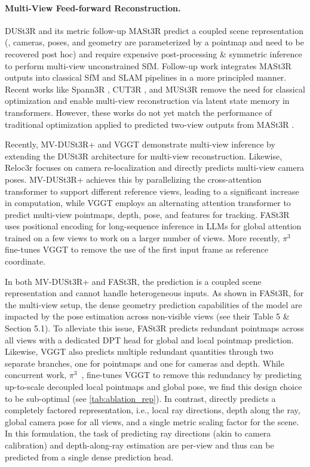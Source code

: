 \paragraph{Multi-View Feed-forward Reconstruction.}

DUSt3R and its metric follow-up MASt3R \cite{LeroyCR2024} predict a coupled scene representation (\ie, cameras, poses, and geometry are parameterized by a pointmap and need to be recovered post hoc) and require expensive post-processing \& symmetric inference to perform multi-view unconstrained SfM.
Follow-up work \cite{DuistZWLCR2025, MuraiDD2025, ElfleZAL2025, PatakSSP2025} integrates MASt3R outputs into classical SfM and SLAM pipelines in a more principled manner.
Recent works like Spann3R \cite{WangA2025}, CUT3R \cite{WangZHEK2025}, and MUSt3R \cite{CabonSACCRL2025} remove the need for classical optimization and enable multi-view reconstruction via latent state memory in transformers.
However, these works do not yet match the performance of traditional optimization applied to predicted two-view outputs from MASt3R \cite{DuistZWLCR2025,MuraiDD2025}.

Recently, MV-DUSt3R+ \cite{TangFWXRSY2025} and VGGT \cite{WangCKVRN2025} demonstrate multi-view inference by extending the DUSt3R architecture for multi-view reconstruction.
Likewise, Reloc3r \cite{DongWLCFKY2025} focuses on camera re-localization and directly predicts multi-view camera poses.
MV-DUSt3R+ achieves this by parallelizing the cross-attention transformer to support different reference views, leading to a significant increase in computation, while VGGT employs an alternating attention transformer to predict multi-view pointmaps, depth, pose, and features for tracking.
FASt3R \cite{YangSLHTCCMF2025} uses positional encoding for long-sequence inference in LLMs for global attention trained on a few views to work on a larger number of views.
More recently, $\pi^3$~\cite{WangZZCZLCPSH2025} fine-tunes VGGT to remove the use of the first input frame as reference coordinate.

In both MV-DUSt3R+ and FASt3R, the prediction is a coupled scene representation and cannot handle heterogeneous inputs.
As shown in FASt3R, for the multi-view setup, the dense geometry prediction capabilities of the model are impacted by the pose estimation across non-visible views (see their Table 5 \& Section 5.1).
To alleviate this issue, FASt3R predicts redundant pointmaps across all views with a dedicated DPT head for global and local pointmap prediction.
Likewise, VGGT also predicts multiple redundant quantities through two separate branches,
one for pointmaps and one for cameras and depth.
While concurrent work, $\pi^3$~\cite{WangZZCZLCPSH2025}, fine-tunes VGGT to remove this redundancy by predicting up-to-scale decoupled local pointmaps and global pose, we find this design choice to be sub-optimal (see \cref{tab:ablation_rep}).
In contrast, \coolname directly predicts a completely factored representation, i.e., local ray directions, depth along the ray, global camera pose for all views, and a single metric scaling factor for the scene.
In this formulation, the task of predicting ray directions (akin to camera calibration) and depth-along-ray estimation are per-view and thus can be predicted from a single dense prediction head.

